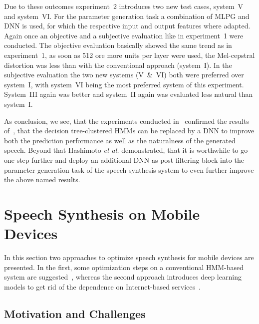 Due to these outcomes experiment~2 introduces two new test cases, system~V and system~VI. For the parameter generation task a combination of \ac{MLPG} and \ac{DNN} is used, for which the respective input and output features where adapted. Again once an objective and a subjective evaluation like in experiment~1 were conducted. The objective evaluation basically showed the same trend as in experiment~1, as soon as 512 ore more units per layer were used, the Mel-cepstral distortion was less than with the conventional approach (system~I). In the subjective evaluation the two new systems (V~\&~VI) both were preferred over system~I, with system~VI being the most preferred system of this experiment. System~III again was better and system~II again was evaluated less natural than system~I.

As conclusion, we see, that the experiments conducted in~\cite{hashimoto:effect} confirmed the results of~\cite{zen:deepstatistical}, that the decision tree-clustered \acp{HMM} can be replaced by a \ac{DNN} to improve both the prediction performance as well as the naturalness of the generated speech. Beyond that Hashimoto \textit{et al.} demonstrated, that it is worthwhile to go one step further and deploy an additional \ac{DNN} as post-filtering block into the parameter generation task of the speech synthesis system to even further improve the above named results.


\section{Speech Synthesis on Mobile Devices}
\label{sec:embeddedspeech}

In this section two approaches to optimize speech synthesis for mobile devices are presented. In the first, some optimization steps on a conventional \ac{HMM}-based system are suggested~\cite{toth:optimizing}, whereas the second approach introduces deep learning models to get rid of the dependence on Internet-based services~\cite{boros:robust}.

\subsection{Motivation and Challenges}
\label{subsec:motembedded}

